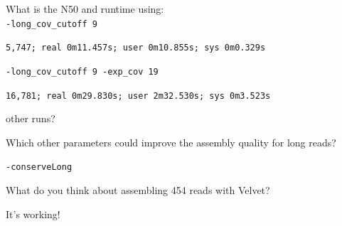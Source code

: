 \begin{questions}
What is the N50 and runtime using:\\
\texttt{-long\_cov\_cutoff 9}
\begin{answer}
\texttt{5,747; real  0m11.457s; user  0m10.855s; sys  0m0.329s}
\end{answer}

\texttt{-long\_cov\_cutoff 9 -exp\_cov 19}
\begin{answer}
\texttt{16,781; real 0m29.830s; user 2m32.530s; sys 0m3.523s}
\end{answer}

other runs?

Which other parameters could improve the assembly quality for long reads?
\begin{answer}
\texttt{-conserveLong}
\end{answer}

What do you think about assembling 454 reads with Velvet?
\begin{answer}
It's working!
\end{answer}
\end{questions}
